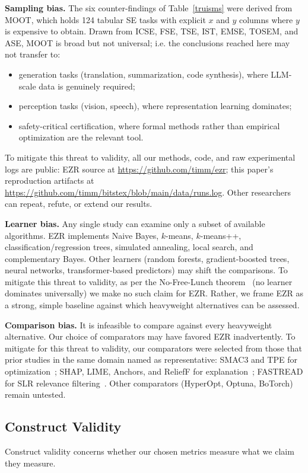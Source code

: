 \documentclass[AMA,STIX2COL]{WileyNJDv5}
\newcommand{\IT}{{\sffamily EZR}}
\begin{document}
{\textbf{Sampling bias.} The six counter-findings of
Table~\ref{truisms} were derived from MOOT, which holds 124
tabular SE tasks with explicit $x$ and $y$ columns where $y$
is expensive to obtain. Drawn from ICSE, FSE, TSE, IST, EMSE,
TOSEM, and ASE, MOOT is broad but not universal;
i.e. the 
conclusions reached here may not transfer to:
\begin{itemize}
\item generation tasks (translation, summarization, code
synthesis), where LLM-scale data is genuinely required;
\item perception tasks (vision, speech), where representation
learning dominates;
\item safety-critical certification, where formal methods
rather than empirical optimization are the relevant tool.
\end{itemize}
To mitigate this threat to validity,
all our methods, code, and raw experimental logs
are public:
\IT{} source at
\url{https://github.com/timm/ezr};
this paper's reproduction artifacts at
\url{https://github.com/timm/bitstex/blob/main/data/runs.log}.
Other researchers can repeat, refute, or extend our results.

\textbf{Learner bias.} Any single study can examine only a subset
of available algorithms. \IT{} implements Naive Bayes,
$k$-means, $k$-means++, classification/regression trees,
simulated annealing, local search, and complementary Bayes.
Other learners (random forests, gradient-boosted trees,
neural networks, transformer-based predictors) may shift the
comparisons.
To mitigate this threat to validity,
as per the No-Free-Lunch
theorem~\cite{wolpert1997nfl} (no learner dominates
universally) we make no such claim for \IT{}. Rather, we frame
\IT{} as a strong, simple baseline against which
heavyweight alternatives can be assessed.

\textbf{Comparison bias.} It is infeasible to compare against every
heavyweight alternative. Our choice of comparators may have
favored \IT{} inadvertently.
To mitigate for this threat to validity,
our comparators were selected from those
that prior studies in the same domain named as
representative: SMAC3 and TPE for
optimization~\cite{hutter2011sequential,bergstra2011tpe};
SHAP, LIME, Anchors, and ReliefF for
explanation~\cite{lundberg2017unified,ribeiro2016should,
ribeiro2018anchors,robnik1997adaptation}; FASTREAD for SLR
relevance filtering~\cite{yu2018total}. Other comparators
(HyperOpt, Optuna, BoTorch) remain untested.

\subsection{Construct Validity}
Construct validity concerns whether our chosen metrics
measure what we claim they measure.

}
\end{document}
